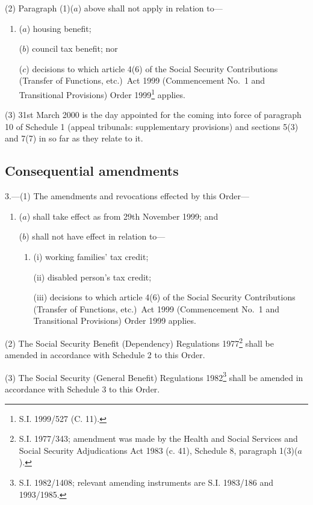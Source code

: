 \documentclass[12pt,a4paper]{article}
\begin{document}
(2) Paragraph (1)($a$)  above shall not apply in relation to---
\begin{enumerate}\item[]
($a$) housing benefit;

($b$) council tax benefit; nor

($c$) decisions to which article 4(6) of the Social Security Contributions (Transfer of Functions, etc.)\ Act 1999 (Commencement No.\ 1 and Transitional Provisions) Order 1999\footnote{\frenchspacing S.I. 1999/527 (C. 11).} applies.
\end{enumerate}

(3) 31st March 2000 is the day appointed for the coming into force of paragraph 10 of Schedule 1 (appeal tribunals: supplementary provisions) and sections 5(3) and 7(7) in so far as they relate to it.

\subsection[3. Consequential amendments]{Consequential amendments}

3.---(1)  The amendments and revocations effected by this Order---
\begin{enumerate}\item[]
($a$) shall take effect as from 29th November 1999; and

($b$) shall not have effect in relation to---
\begin{enumerate}\item[]
(i) working families' tax credit;

(ii) disabled person’s tax credit;

(iii) decisions to which article 4(6) of the Social Security Contributions (Transfer of Functions, etc.)\ Act 1999 (Commencement No.\ 1 and Transitional Provisions) Order 1999 applies.
\end{enumerate}
\end{enumerate}

(2) The Social Security Benefit (Dependency) Regulations 1977\footnote{\frenchspacing S.I. 1977/343; amendment was made by the Health and Social Services and Social Security Adjudications Act 1983 (c. 41), Schedule 8, paragraph 1(3)($a$).} shall be amended in accordance with Schedule 2 to this Order.

(3) The Social Security (General Benefit) Regulations 1982\footnote{\frenchspacing S.I. 1982/1408; relevant amending instruments are S.I. 1983/186 and 1993/1985.} shall be amended in accordance with Schedule 3 to this Order.
\end{document}
